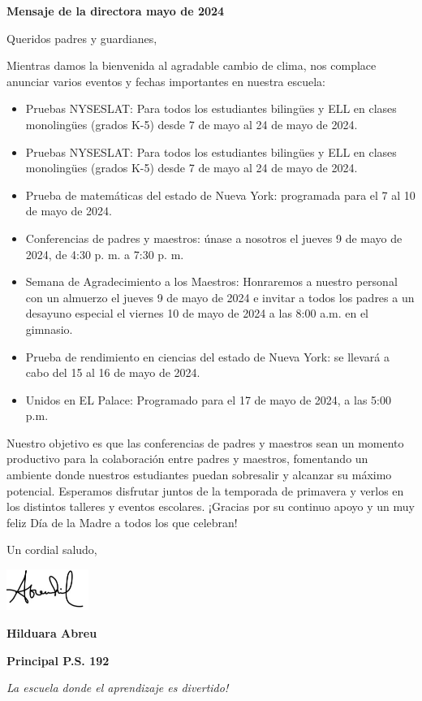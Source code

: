 \documentclass[12pt,letterpaper]{article}
\begin{document}
\textbf{Mensaje de la directora mayo de 2024}

Queridos padres y guardianes,

Mientras damos la bienvenida al agradable cambio de clima, nos complace anunciar varios eventos y fechas importantes en nuestra escuela:
\begin{itemize}
\item Pruebas NYSESLAT: Para todos los estudiantes bilingües y ELL en clases monolingües (grados K-5) desde 7 de mayo al 24 de mayo de 2024.
\item Pruebas NYSESLAT: Para todos los estudiantes bilingües y ELL en clases monolingües (grados K-5) desde 7 de mayo al 24 de mayo de 2024.
\item Prueba de matemáticas del estado de Nueva York: programada para el 7 al 10 de mayo de 2024.
\item Conferencias de padres y maestros: únase a nosotros el jueves 9 de mayo de 2024, de 4:30 p. m. a 7:30 p. m.
\item Semana de Agradecimiento a los Maestros: Honraremos a nuestro personal con un almuerzo el jueves 9 de mayo de 2024 e invitar a todos los padres a un desayuno especial el viernes 10 de mayo de 2024 a las 8:00 a.m. en el gimnasio.
\item Prueba de rendimiento en ciencias del estado de Nueva York: se llevará a cabo del 15 al 16 de mayo de 2024.
\item Unidos en EL Palace: Programado para el 17 de mayo de 2024, a las 5:00 p.m.
\end{itemize}

Nuestro objetivo es que las conferencias de padres y maestros sean un momento productivo para la colaboración entre padres y maestros, fomentando un ambiente donde nuestros estudiantes puedan
\pagebreak
\vspace*{0.7in}
sobresalir y alcanzar su máximo potencial. Esperamos disfrutar juntos de la temporada de primavera y verlos en los distintos talleres y eventos escolares. ¡Gracias por su continuo apoyo y un muy feliz Día de la Madre a todos los que celebran!

Un cordial saludo,

\includegraphics[width=0.2\textwidth]{hil_signature}

\textbf{Hilduara Abreu}

\textbf{Principal P.S. 192}

\textit{La escuela donde el aprendizaje es divertido!}
\end{document}
